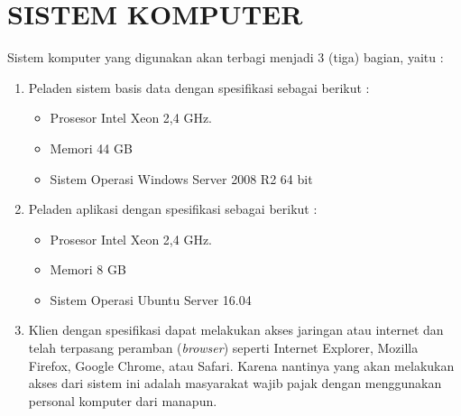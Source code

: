 \chapter{SISTEM KOMPUTER}

Sistem komputer yang digunakan akan terbagi menjadi 3 (tiga) bagian, yaitu :

\begin{enumerate}
	\item Peladen sistem basis data dengan spesifikasi sebagai berikut :
	
	\begin{itemize}
		\item Prosesor Intel Xeon 2,4 GHz.
		\item Memori 44 GB
		\item Sistem Operasi Windows Server 2008 R2 64 bit
	\end{itemize}	
	
	\item Peladen aplikasi dengan spesifikasi sebagai berikut :
	
	\begin{itemize}
		\item Prosesor Intel Xeon 2,4 GHz.
		\item Memori 8 GB
		\item Sistem Operasi Ubuntu Server 16.04
	\end{itemize}	
	
	\item Klien dengan spesifikasi dapat melakukan akses jaringan atau internet dan telah terpasang peramban (\textit{browser}) seperti Internet Explorer, Mozilla Firefox, Google Chrome, atau Safari. Karena nantinya yang akan melakukan akses dari sistem ini adalah masyarakat wajib pajak dengan menggunakan personal komputer dari manapun.
\end{enumerate}